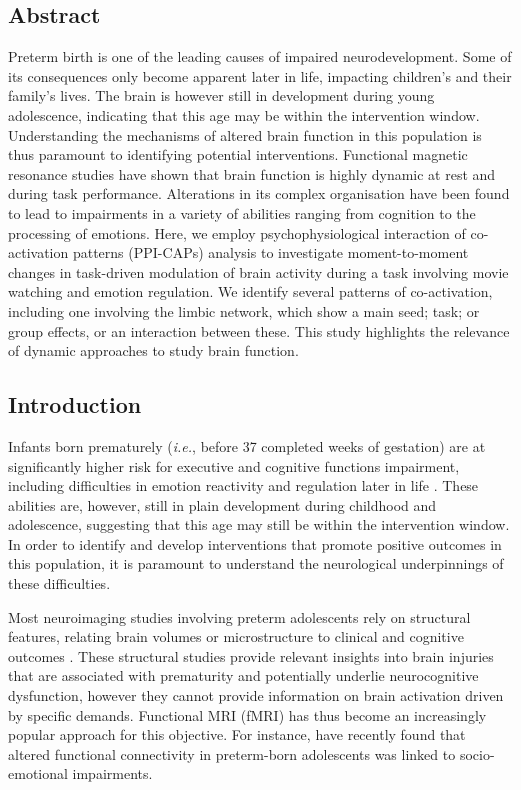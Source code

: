 \subsection*{Abstract}
Preterm birth is one of the leading causes of impaired neurodevelopment. Some of its consequences only become apparent later in life, impacting children's and their family's lives. The brain is however still in development during young adolescence, indicating that this age may be within the intervention window. Understanding the mechanisms of altered brain function in this population is thus paramount to identifying potential interventions. Functional magnetic resonance studies have shown that brain function is highly dynamic at rest and during task performance. Alterations in its complex organisation have been found to lead to impairments in a variety of abilities ranging from cognition to the processing of emotions. Here, we employ psychophysiological interaction of co-activation patterns (PPI-CAPs) analysis to investigate moment-to-moment changes in task-driven modulation of brain activity during a task involving movie watching and emotion regulation. We identify several patterns of co-activation, including one involving the limbic network, which show a main seed; task; or group effects, or an interaction between these. This study highlights the relevance of dynamic approaches to study brain function.

\subsection{Introduction}


Infants born prematurely (\textit{i.e.}, before 37 completed weeks of gestation) are at significantly higher risk for executive and cognitive functions impairment, including difficulties in emotion reactivity and regulation later in life \citep{Evrard2011, Langerock2013, Yaari2018}. These abilities are, however, still in plain development during childhood and adolescence, suggesting that this age may still be within the intervention window. In order to identify and develop interventions that promote positive outcomes in this population, it is paramount to understand the neurological underpinnings of these difficulties. 

Most neuroimaging studies involving preterm adolescents rely on structural features, relating brain volumes or microstructure to clinical and cognitive outcomes \citep{Huning2018, Groeschel2019, Boardman2020}. These structural studies provide relevant insights into brain injuries that are associated with prematurity and potentially underlie neurocognitive dysfunction, however they cannot provide information on brain activation driven by specific demands. Functional MRI (fMRI) has thus become an increasingly popular approach for this objective. For instance, \citet{Johns2019} have recently found that altered functional connectivity in preterm-born adolescents was linked to socio-emotional impairments.




